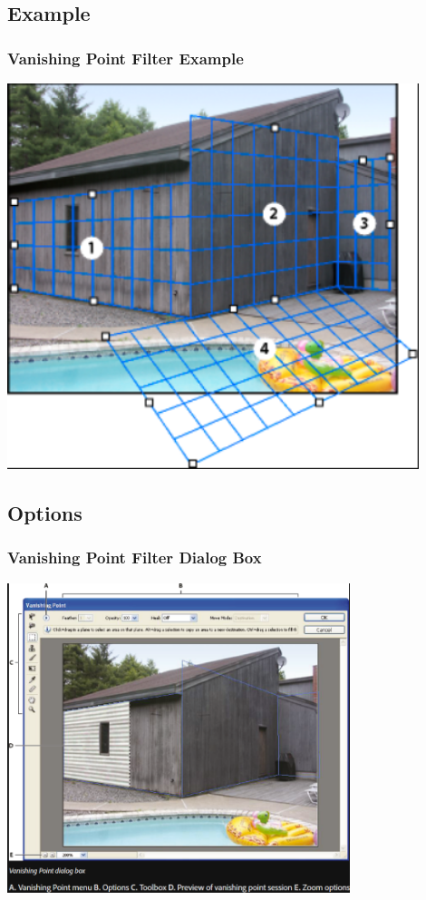 \documentclass{beamer}
\begin{document}
			\subsection{Example}		
	\begin{frame}
		\frametitle{Vanishing Point Filter Example}
		\includegraphics[width=0.9\textwidth]{images/vanishing point example.png}
	\end{frame}

			\subsection{Options}		
\begin{frame}
	\frametitle{Vanishing Point Filter Dialog Box}
	\begin{center}
	\includegraphics[width=0.75\textwidth]{images/vanishing point dialog box.png}
	\end{center}
\end{frame}
\end{document}

